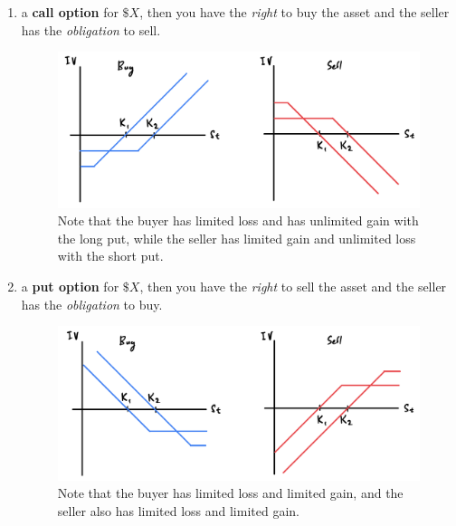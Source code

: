 \documentclass{article}
\begin{document}
  \begin{example}
    \begin{enumerate}
      \item a \textbf{call option} for $\$X$, then you have the \textit{right} to buy the asset and the seller has the \textit{obligation} to sell. 
      \begin{figure}[H]
        \centering 
        \includegraphics[scale=0.4]{img/call_options.png}
        \caption{Note that the buyer has limited loss and has unlimited gain with the long put, while the seller has limited gain and unlimited loss with the short put.} 
        \label{fig:call_options}
      \end{figure}
      \item a \textbf{put option} for $\$X$, then you have the \textit{right} to sell the asset and the seller has the \textit{obligation} to buy. 
      \begin{figure}[H]
        \centering 
        \includegraphics[scale=0.4]{img/put_options.png}
        \caption{Note that the buyer has limited loss and limited gain, and the seller also has limited loss and limited gain. } 
        \label{fig:put_options}
      \end{figure}
    \end{enumerate}
  \end{example}
\end{document}
